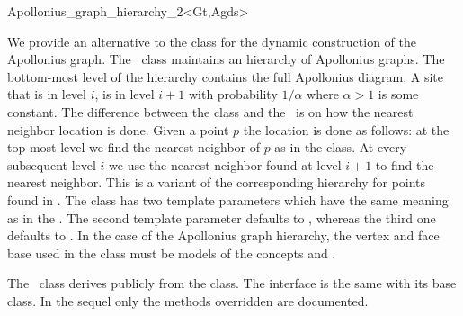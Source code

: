 
\begin{ccRefClass}{Apollonius_graph_hierarchy_2<Gt,Agds>}

\ccDefinition

We provide an alternative to the class
 for the dynamic
construction of the Apollonius graph. The \ccRefName\ class maintains
an hierarchy of Apollonius graphs. The bottom-most level of the
hierarchy contains the full Apollonius diagram. A site that
is in level $i$, is in level $i+1$ with probability $1/\alpha$
where $\alpha > 1$ is some constant. The difference between the
 class and the
\ccRefName\ is on how the nearest neighbor location is done. Given a
point $p$ the location is done as follows: at the top most level we
find the nearest neighbor of $p$ as in the
 class. At every
subsequent level $i$ we use the nearest neighbor found at level $i+1$
to find the nearest neighbor. This is a variant of the corresponding
hierarchy for points found in \cite{d-iirdt-98}.
%
The class has two template parameters which have the same meaning as
in the . The second
template parameter defaults to , whereas the third one
defaults to . 
In the case of the Apollonius graph hierarchy, the vertex and face
base used in the  class
must be models of the concepts
 and
.

The \ccRefName\ class derives publicly from the
 class. The interface is
the same with its base class. In the sequel only the methods
overridden are documented.



\end{ccRefClass}
